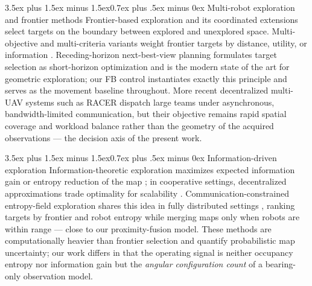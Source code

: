 \documentclass[journal]{IEEEtran}
\makeatletter
\renewcommand{\subsection}{\@startsection{subsection}{2}{\z@}%
{3.5ex plus 1.5ex minus 1.5ex}{0.7ex plus .5ex minus 0ex}%
{\normalfont\normalsize\bfseries}}
\makeatother
\begin{document}
\subsection{Multi-robot exploration and frontier methods}
Frontier-based exploration \cite{Yamauchi1997, Yamauchi1998} and its
coordinated extensions \cite{Burgard2005, Franchi2009} select targets on the
boundary between explored and unexplored space. Multi-objective and
multi-criteria variants weight frontier targets by distance, utility, or
information \cite{Gonzalez2002, BasilicoAmigoni2011}. Receding-horizon
next-best-view planning \cite{Bircher2016, Bircher2018} formulates target
selection as short-horizon optimization and is the modern state of the art for
geometric exploration; our FB control instantiates exactly this principle and
serves as the movement baseline throughout. More recent decentralized
multi-UAV systems such as RACER \cite{Zhou2023} dispatch large teams under
asynchronous, bandwidth-limited communication, but their objective remains
rapid spatial coverage and workload balance rather than the geometry of the
acquired observations --- the decision axis of the present work.

\subsection{Information-driven exploration}
Information-theoretic exploration maximizes expected information gain or
entropy reduction of the map \cite{Bourgault2002, Stachniss2005, Julian2014,
Charrow2015}; in cooperative settings, decentralized approximations trade
optimality for scalability \cite{Grocholsky2002, Ponda2012}.
Communication-constrained entropy-field exploration shares this idea in fully
distributed settings \cite{Pongsirijinda2025}, ranking targets by frontier and
robot entropy while merging maps only when robots are within range --- close
to our proximity-fusion model. These methods are computationally heavier than
frontier selection \cite{Grocholsky2002, Ponda2012, Lauri2023} and quantify
probabilistic map uncertainty; our work differs in that the operating signal is
neither occupancy entropy nor information gain but the \emph{angular
configuration count} of a bearing-only observation model.
\end{document}
